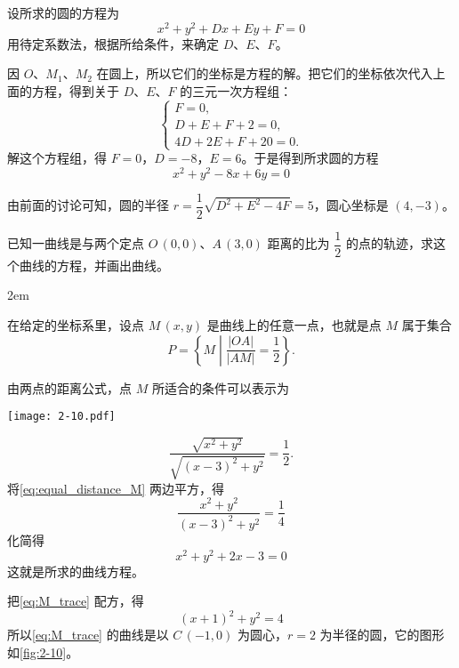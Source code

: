 \begin{solution}
  设所求的圆的方程为
  \[ x^2+y^2+Dx+Ey+F=0 \]
  用待定系数法，根据所给条件，来确定 $D$、$E$、$F$。

  因 $O$、$M_1$、$M_2$ 在圆上，所以它们的坐标是方程的解。把它们的坐标依次代入上面的方程，得到关于 $D$、$E$、$F$ 的三元一次方程组：
  \[\begin{cases} F=0,\\D+E+F+2=0,\\4D+2E+F+20=0. \end{cases}\]
  解这个方程组，得 $F=0$，$D=-8$，$E=6$。于是得到所求圆的方程
  \[x^2+y^2-8x+6y=0\]

  由前面的讨论可知，圆的半径 $r=\dfrac{1}{2}\sqrt{D^2+E^2-4F}=5$，圆心坐标是 $(4,-3)$。
\end{solution}
\begin{example}
  已知一曲线是与两个定点 $O\,(0,0)$、$A\,(3,0)$ 距离的比为 $\dfrac{1}{2}$ 的点的轨迹，求这个曲线的方程，并画出曲线。
\end{example}
\noindent
\begin{minipage}{0.6\linewidth}\parindent2em
\begin{solution}
  在给定的坐标系里，设点 $M\,(x,y)$ 是曲线上的任意一点，也就是点 $M$ 属于集合
  \[P=\left\{ M \middle\vert \frac{|OA|}{|AM|}=\frac{1}{2} \right\}.\]

  由两点的距离公式，点 $M$ 所适合的条件可以表示为
\end{solution}
\end{minipage}\hfill
\begin{minipage}{0.35\linewidth}\centering
\begin{figurehere}
  \texttt{[image: 2-10.pdf]}
  \caption{}\label{fig:2-10}
\end{figurehere}
\end{minipage}

\medskip
\begin{equation}
  \label{eq:equal_distance_M}
  \frac{\sqrt{x^2+y^2}}{\sqrt{(x-3)^2+y^2}}=\frac{1}{2}.
\end{equation}
将\cref{eq:equal_distance_M} 两边平方，得
\[ \frac{x^2+y^2}{(x-3)^2+y^2}=\frac{1}{4}\]
化简得
\begin{equation}
  \label{eq:M_trace}
  x^2+y^2+2x-3=0
\end{equation}
这就是所求的曲线方程。

把\cref{eq:M_trace} 配方，得
\[ (x+1)^2+y^2=4\]
所以\cref{eq:M_trace} 的曲线是以 $C\,(-1,0)$ 为圆心，$r=2$ 为半径的圆，它的图形如\cref{fig:2-10}。

